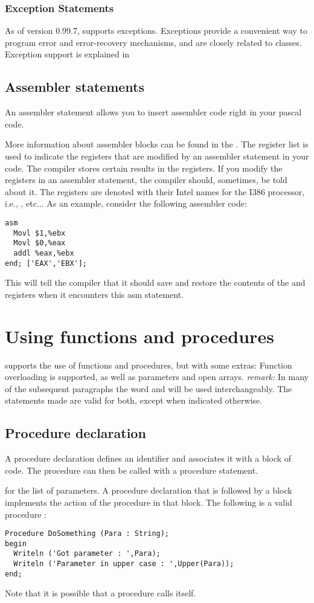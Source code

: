 \documentclass{report}
\begin{document}
\subsection{Exception Statements}
As of version 0.99.7, \fpc supports exceptions. Exceptions provide a
convenient way to program error and error-recovery mechanisms, and are
closely related to classes.
Exception support is explained in 
\section{Assembler statements}
An assembler statement allows you to insert assembler code right in your
pascal code.

More information about assembler blocks can be found in the \progref.
The register list is used to indicate the registers that are modified by an
assembler statement in your code. The compiler stores certain results in the
registers. If you modify the registers in an assembler statement, the compiler
should, sometimes, be told about it. The registers are denoted with their
Intel names for the I386 processor, i.e., ,  etc...
As an example, consider the following assembler code:
\begin{verbatim}
asm
  Movl $1,%ebx
  Movl $0,%eax
  addl %eax,%ebx
end; ['EAX','EBX'];
\end{verbatim}
This will tell the compiler that it should save and restore the contents of
the  and  registers when it encounters this asm statement.
\chapter{Using functions and procedures}
\label{ch:Procedures}
\fpc supports the use of functions and procedures, but with some extras:
Function overloading is supported, as well as  parameters and
open arrays.
{\em remark:} In many of the subsequent paragraphs the word 
and  will be used interchangeably. The statements made are
valid for both, except when indicated otherwise.
\section{Procedure declaration}
A procedure declaration defines an identifier and associates it with a
block of code. The procedure can then be called with a procedure statement.

 for the list of parameters.
A procedure declaration that is followed by a block implements the action of
the procedure in that block.
The following is a valid procedure :
\begin{verbatim}
Procedure DoSomething (Para : String);
begin
  Writeln ('Got parameter : ',Para);
  Writeln ('Parameter in upper case : ',Upper(Para));
end;
\end{verbatim}
Note that it is possible that a procedure calls itself.
\end{document}
